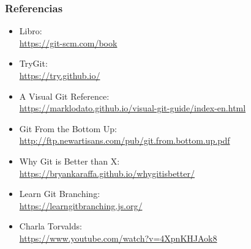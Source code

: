 \documentclass[a4paper, 12pt, aspectratio=169,
\ifhandout handout \else \fi
]{beamer}
\begin{document}
\begin{frame}[fragile]
    \frametitle{Referencias}
    \begin{itemize}

        \item Libro:\\
            \url{https://git-scm.com/book}

        \item TryGit:\\
            \url{https://try.github.io/}

        \item A Visual Git Reference:\\
            \url{https://marklodato.github.io/visual-git-guide/index-en.html}

        \item Git From the Bottom Up:\\
            \url{http://ftp.newartisans.com/pub/git.from.bottom.up.pdf}

        \item Why Git is Better than X:\\
            \url{https://bryankaraffa.github.io/whygitisbetter/}

        \item Learn Git Branching: \\
            \url{https://learngitbranching.js.org/}

        \item Charla Torvalds:\\
            \url{https://www.youtube.com/watch?v=4XpnKHJAok8}
    \end{itemize}
\end{frame}
\end{document}

